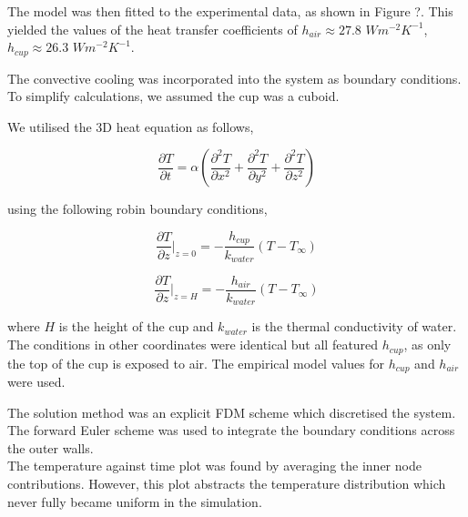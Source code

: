 \documentclass[a0paper,portrait, 3pt]{baposter}
\begin{document}
\begin{poster}
{The model was then fitted to the experimental data, as shown in Figure ?. This yielded the values of the heat transfer coefficients of $h_{air} \approx 27.8$ $ Wm^{-2}K^{-1}$, $h_{cup} \approx 26.3 $ $Wm^{-2}K^{-1}$.

}


{

 The convective cooling was incorporated into the system as boundary conditions. To simplify calculations, we assumed the cup was a cuboid.
 
 We utilised the 3D heat equation as follows, 

\begin{equation}
    \frac{\partial T }{\partial t} = \alpha \left( \frac{\partial^2 T }{\partial x^2} + \frac{\partial^2 T }{\partial y^2} + \frac{\partial^2 T }{\partial z^2} \right)
\end{equation}

using the following robin boundary conditions, 

\begin{equation}
    \frac{\partial T}{\partial z} \Bigr|_{z = 0} = - \frac{h_{cup}}{k_{water}} (T - T_{\infty})
\end{equation}

\begin{equation}
    \frac{\partial T}{\partial z} \Bigr|_{z = H} = - \frac{h_{air}}{k_{water}} (T - T_{\infty})
\end{equation}

where $H$ is the height of the cup and $k_{water}$ is the thermal conductivity of water. The conditions in other coordinates were identical but all featured $h_{cup}$, as only the top of the cup is exposed to air. The empirical model values for $h_{cup}$ and $h_{air}$ were used.

The solution method was an explicit FDM scheme which discretised the system. The forward Euler scheme was used to integrate the boundary conditions across the outer walls. \\
The temperature against time plot was found by averaging the inner node contributions. However, this plot abstracts the temperature distribution which never fully became uniform in the simulation.

}
\end{poster}
\end{document}

